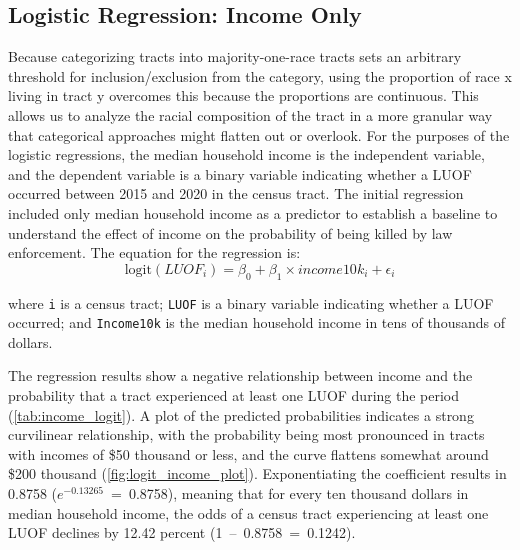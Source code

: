 \documentclass[12pt]{article}
\begin{document}
\subsection{Logistic Regression: Income Only}

Because categorizing tracts into majority-one-race tracts sets an arbitrary threshold for inclusion/exclusion from the category, using the proportion of race x living in tract y overcomes this because the proportions are continuous. This allows us to analyze the racial composition of the tract in a more granular way that categorical approaches might flatten out or overlook. For the purposes of the logistic regressions, the median household income is the independent variable, and the dependent variable is a binary variable indicating whether a LUOF occurred between 2015 and 2020 in the census tract. The initial regression included only median household income as a predictor to establish a baseline to understand the effect of income on the probability of being killed by law enforcement. The equation for the regression is:
\begin{equation}
\text{logit}(LUOF_{i})=\beta_{0} + \beta_{1} \times income10k_{i} + \epsilon_{i}
\end{equation}

\noindent{}where \texttt{i} is a census tract; \texttt{LUOF} is a binary variable indicating whether a LUOF occurred; and \texttt{Income10k} is the median household income in tens of thousands of dollars.

The regression results show a negative relationship between income and the probability that a tract experienced at least one LUOF during the period (\autoref{tab:income_logit}). A plot of the predicted probabilities indicates a strong curvilinear relationship, with the probability being most pronounced in tracts with incomes of \$50 thousand or less, and the curve flattens somewhat around \$200 thousand (\autoref{fig:logit_income_plot}). Exponentiating the coefficient results in 0.8758 ($e^{-0.13265}$~=~0.8758), meaning that for every ten thousand dollars in median household income, the odds of a census tract experiencing at least one LUOF declines by 12.42 percent (1~--~0.8758~=~0.1242).
\end{document}
